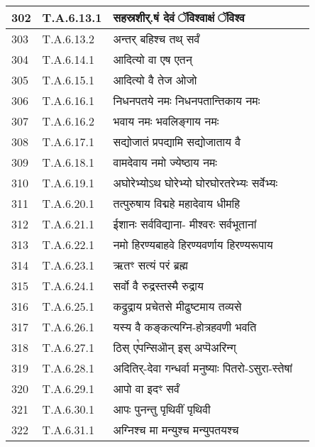 \documentclass[17pt]{extarticle}
\begin{document}
\begin{longtable}{||p{0.4in}||p{0.9in}||p{4.0in}||p{0.9in}||}
        \hline
            302 & T.A.6.13.1 & सहस्रशीर्.षं देवं ॅविश्वाक्षं ॅविश्व &      \\
        \hline
            303 & T.A.6.13.2 & अन्तर् बहिश्च तथ् सर्वं &      \\
        \hline
            304 & T.A.6.14.1 & आदित्यो वा एष एतन् &      \\
        \hline
            305 & T.A.6.15.1 & आदित्यो वै तेज ओजो &      \\
        \hline
            306 & T.A.6.16.1 & निधनपतये नमः निधनपतान्तिकाय नमः &      \\
        \hline
            307 & T.A.6.16.2 & भवाय नमः भवलिङ्गाय नमः &      \\
        \hline
            308 & T.A.6.17.1 & सद्योजातं प्रपद्यामि सद्योजाताय वै &      \\
        \hline
            309 & T.A.6.18.1 & वामदेवाय नमो ज्येष्ठाय नमः &      \\
        \hline
            310 & T.A.6.19.1 & अघोरेभ्योऽथ घोरेभ्यो घोरघोरतरेभ्यः सर्वेभ्यः &      \\
        \hline
            311 & T.A.6.20.1 & तत्पुरुषाय विद्महे महादेवाय धीमहि &      \\
        \hline
            312 & T.A.6.21.1 & ईशानः सर्वविद्याना{-} मीश्वरः सर्वभूतानां &      \\
        \hline
            313 & T.A.6.22.1 & नमो हिरण्यबाहवे हिरण्यवर्णाय हिरण्यरूपाय &      \\
        \hline
            314 & T.A.6.23.1 & ऋतꣳ सत्यं परं ब्रह्म &      \\
        \hline
            315 & T.A.6.24.1 & सर्वो वै रुद्रस्तस्मै रुद्राय &      \\
        \hline
            316 & T.A.6.25.1 & कद्रुद्राय प्रचेतसे मीढुष्टमाय तव्यसे &      \\
        \hline
            317 & T.A.6.26.1 & यस्य वै कङ्कत्यग्नि{-}होत्रहवणी भवति &      \\
        \hline
            318 & T.A.6.27.1 & ठिस् ए꣡पन्सिऒन् इस् अप्पॆअरिन्ग् &      \\
        \hline
            319 & T.A.6.28.1 & अदितिर्{-}देवा गन्धर्वा मनुष्याः पितरो{-}ऽसुरा{-}स्तेषां &      \\
        \hline
            320 & T.A.6.29.1 & आपो वा इदꣳ सर्वं &      \\
        \hline
            321 & T.A.6.30.1 & आपः पुनन्तु पृथिवीं पृथिवी &      \\
        \hline
            322 & T.A.6.31.1 & अग्निश्च मा मन्युश्च मन्युपतयश्च &      \\

\end{longtable}
\end{document}
